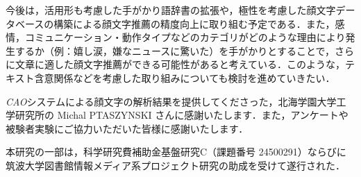 \documentclass[japanese]{jnlp_1.4}
\begin{document}
今後は，活用形も考慮した手がかり語辞書の拡張や，極性を考慮した顔文字データベースの構築による顔文字推薦の精度向上に取り組む予定である．また，感情，コミュニケーション・動作タイプなどのカテゴリがどのような理由により発生するか（例：嬉し涙，嫌なニュースに驚いた）を手がかりとすることで，さらに文章に適した顔文字推薦ができる可能性があると考えている．このような，テキスト含意関係などを考慮した取り組みについても検討を進めていきたい．

\acknowledgment

{\it CAO}システムによる顔文字の解析結果を提供してくださった，北海学園大学工学研究所の Michal PTASZYNSKI さんに感謝いたします．また，アンケートや被験者実験にご協力いただいた皆様に感謝いたします．

本研究の一部は，科学研究費補助金基盤研究C（課題番号 24500291）ならびに筑波大学図書館情報メディア系プロジェクト研究の助成を受けて遂行された．
\end{document}
